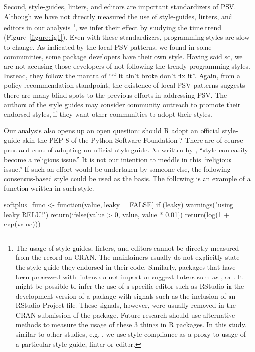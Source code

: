 Second, style-guides, linters, and editors are important standardizers of PSV. Although we have not directly measured the use of style-guides, linters, and editors in our analysis \footnote{The usage of style-guides, linters, and editors cannot be directly measured from the record on CRAN. The maintainers usually do not explicitly state the style-guide they endorsed in their code. Similarly, packages that have been processed with linters do not import or suggest linters such as ,  or . It might be possible to infer the use of a specific editor such as RStudio in the development version of a package with signals such as the inclusion of an RStudio Project file. These signals, however, were usually removed in the CRAN submission of the package. Future research should use alternative methods to measure the usage of these 3 things in R packages. In this study, similar to other studies, e.g. \citet{bafatakis:2019:PCS}, we use style compliance as a proxy to usage of a particular style guide, linter or editor.}, we infer their effect by studying the time trend (Figure~\ref{figure:fig1}). Even with these standardizers, programming styles are slow to change. As indicated by the local PSV patterns, we found in some communities, some package developers have their own style. Having said so, we are not accusing those developers of not following the trendy programming styles. Instead, they follow the mantra of ``if it ain't broke don't fix it''. Again, from a policy recommendation standpoint, the existence of local PSV patterns suggests there are many blind spots to the previous efforts in addressing PSV. The authors of the style guides may consider community outreach to promote their endorsed styles, if they want other communities to adopt their styles.

Our analysis also opens up an open question: should R adopt an official style-guide akin the PEP-8 of the Python Software Foundation \citep{vanrossum}? There are of course pros and cons of adopting an official style-guide. As written by \citet{christiansen}, ``style can easily become a religious issue.'' It is not our intention to meddle in this ``religious issue.'' If such an effort would be undertaken by someone else, the following consensus-based style could be used as the basis. The following is an example of a function written in such style.

\begin{example}
softplus_func <- function(value, leaky = FALSE) {
    if (leaky) {
        warnings("using leaky RELU!")
        return(ifelse(value > 0, value, value * 0.01))
    }
    return(log(1 + exp(value)))
}
\end{example}

